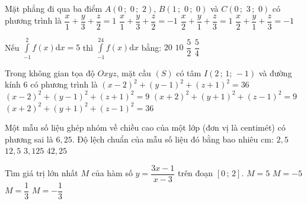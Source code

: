 \begin{ex}%
	Mặt phẳng đi qua ba điểm $ A\left(0\,;\,\,0\,;\,\,2\right)$, $ B\left(1\,;\,\,0\,;\,\,0\right)$ và $C\left(0\,;\,\,3\,;\,\,0\right)$ có phương trình là
	\choice
	{\True $\dfrac{x}{1}+\dfrac{y}{3}+\dfrac{z}{2}=1$}
	{$\dfrac{x}{1}+\dfrac{y}{3}+\dfrac{z}{2}=-1$}
	{$\dfrac{x}{2}+\dfrac{y}{1}+\dfrac{z}{3}=1$}
	{$\dfrac{x}{2}+\dfrac{y}{1}+\dfrac{z}{3}=-1$}
\end{ex}
\begin{ex}%
	Nếu $\displaystyle\int\limits_{-1}^2f(x)\text{d}x=5$ thì $\displaystyle\int\limits_{-1}^24f(x)\text{d}x$ bằng:
	\choice
	{\True $ 20$}
	{$ 10$}
	{$\dfrac{5}{2}$}
	{$\dfrac{5}{4}$}
\end{ex}
\begin{ex}%
	Trong không gian tọa độ $ Oxyz$, mặt cầu $(S)$ có tâm $ I\left(2\,;\,1;\,-1\right)$ và đường kính 6 có phương trình là
	\choice
	{$(x-2)^2+(y-1)^2+(z+1)^2=36$}
	{\True $(x-2)^2+(y-1)^2+(z+1)^2=9$}
	{$(x+2)^2+(y+1)^2+(z-1)^2=9$}
	{$(x+2)^2+(y+1)^2+(z-1)^2=36$}
\end{ex}
\begin{ex}%
	Một mẫu số liệu ghép nhóm về chiều cao của một lớp (đơn vị là centimét) có phương sai là $ 6,25$. Độ lệch chuẩn của mẫu số liệu đó bằng bao nhiêu cm:
	\choice
	{\True $ 2,5$ }
	{$ 12,5$}
	{$ 3,125$}
	{$ 42,25$}
\end{ex}
\begin{ex}%
	Tìm giá trị lớn nhất $ M$ của hàm số $ y=\dfrac{3x-1}{x-3}$ trên đoạn $\left[0\,;\,2\right]$.
	\choice
	{$ M=5$}
	{$ M=-5$}
	{\True $ M=\dfrac{1}{3}$}
	{$ M=-\dfrac{1}{3}$}
\end{ex}
